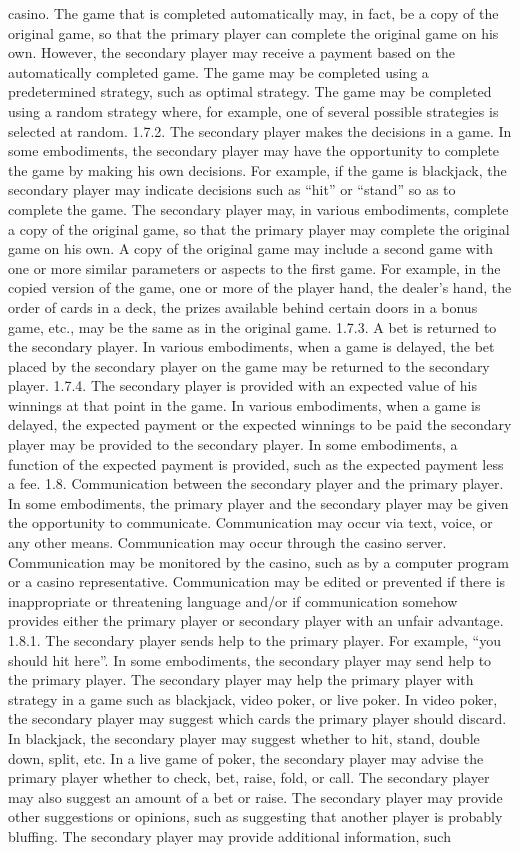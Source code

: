 \documentclass[11pt,a4paper]{article}
\begin{document}
casino. The game that is completed automatically may, in fact, be a copy of the original game, so that the primary player can complete the original game on his own. However, the secondary player may receive a payment based on the automatically completed game. The game may be completed using a predetermined strategy, such as optimal strategy. The game may be completed using a random strategy where, for example, one of several possible strategies is selected at random. 1.7.2. The secondary player makes the decisions in a game. In some embodiments, the secondary player may have the opportunity to complete the game by making his own decisions. For example, if the game is blackjack, the secondary player may indicate decisions such as “hit” or “stand” so as to complete the game. The secondary player may, in various embodiments, complete a copy of the original game, so that the primary player may complete the original game on his own. A copy of the original game may include a second game with one or more similar parameters or aspects to the first game. For example, in the copied version of the game, one or more of the player hand, the dealer's hand, the order of cards in a deck, the prizes available behind certain doors in a bonus game, etc., may be the same as in the original game. 1.7.3. A bet is returned to the secondary player. In various embodiments, when a game is delayed, the bet placed by the secondary player on the game may be returned to the secondary player. 1.7.4. The secondary player is provided with an expected value of his winnings at that point in the game. In various embodiments, when a game is delayed, the expected payment or the expected winnings to be paid the secondary player may be provided to the secondary player. In some embodiments, a function of the expected payment is provided, such as the expected payment less a fee. 1.8. Communication between the secondary player and the primary player. In some embodiments, the primary player and the secondary player may be given the opportunity to communicate. Communication may occur via text, voice, or any other means. Communication may occur through the casino server. Communication may be monitored by the casino, such as by a computer program or a casino representative. Communication may be edited or prevented if there is inappropriate or threatening language and/or if communication somehow provides either the primary player or secondary player with an unfair advantage. 1.8.1. The secondary player sends help to the primary player. For example, “you should hit here”. In some embodiments, the secondary player may send help to the primary player. The secondary player may help the primary player with strategy in a game such as blackjack, video poker, or live poker. In video poker, the secondary player may suggest which cards the primary player should discard. In blackjack, the secondary player may suggest whether to hit, stand, double down, split, etc. In a live game of poker, the secondary player may advise the primary player whether to check, bet, raise, fold, or call. The secondary player may also suggest an amount of a bet or raise. The secondary player may provide other suggestions or opinions, such as suggesting that another player is probably bluffing. The secondary player may provide additional information, such 
\end{document}

